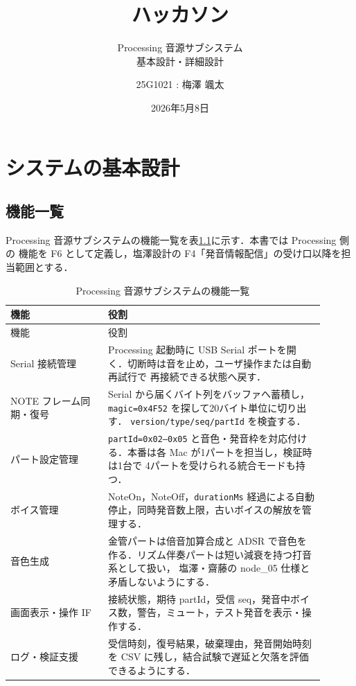 \documentclass[lualatex,book,openany,paper=a4paper,jafontsize=11.5pt,jafontscale=1.05]{jlreq}
\title{ハッカソン}
\subtitle{Processing 音源サブシステム\\基本設計・詳細設計}
\author{
  25G1021 : 梅澤 颯太
}
\date{2026年5月8日}
\begin{document}
\hypersetup{pageanchor=false}
\maketitle

\setcounter{tocdepth}{2}
\tableofcontents \thispagestyle{empty}

\clearpage
\hypersetup{pageanchor=true}
\chapter{システムの基本設計}\setcounter{page}{1}

\section{機能一覧}
Processing 音源サブシステムの機能一覧を表\ref{tab:fbs}に示す．本書では Processing 側の
機能を F6 として定義し，塩澤設計の F4「発音情報配信」の受け口以降を担当範囲とする．

\begin{longtable}{p{0.28\linewidth}p{0.62\linewidth}}
\caption{Processing 音源サブシステムの機能一覧}\label{tab:fbs}\\
\hline
機能 & 役割 \\
\hline
\endfirsthead
\hline
機能 & 役割 \\
\hline
\endhead
Serial 接続管理 &
Processing 起動時に USB Serial ポートを開く．切断時は音を止め，ユーザ操作または自動再試行で
再接続できる状態へ戻す． \\
\hline
NOTE フレーム同期・復号 &
Serial から届くバイト列をバッファへ蓄積し，\texttt{magic=0x4F52} を探して20バイト単位に切り出す．
\texttt{version/type/seq/partId} を検査する． \\
\hline
パート設定管理 &
\texttt{partId=0x02--0x05} と音色・発音枠を対応付ける．本番は各 Mac が1パートを担当し，検証時は1台で
4パートを受けられる統合モードも持つ． \\
\hline
ボイス管理 &
NoteOn，NoteOff，\texttt{durationMs} 経過による自動停止，同時発音数上限，古いボイスの解放を管理する． \\
\hline
音色生成 &
金管パートは倍音加算合成と ADSR で音色を作る．リズム伴奏パートは短い減衰を持つ打音系として扱い，
塩澤・齋藤の node\_05 仕様と矛盾しないようにする． \\
\hline
画面表示・操作 IF &
接続状態，期待 partId，受信 seq，発音中ボイス数，警告，ミュート，テスト発音を表示・操作する． \\
\hline
ログ・検証支援 &
受信時刻，復号結果，破棄理由，発音開始時刻を CSV に残し，結合試験で遅延と欠落を評価できるようにする． \\
\hline
\end{longtable}
\end{document}
